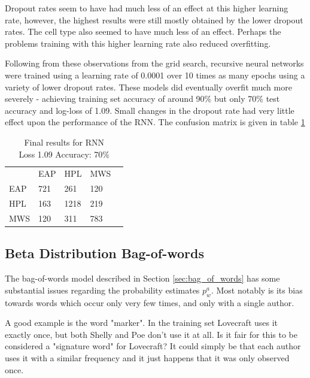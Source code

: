     Dropout rates seem to have had much less of an effect at this higher
    learning rate, however, the highest results were still mostly obtained by
    the lower dropout rates. The cell type also seemed to have much less of an
    effect. Perhaps the problems training with this higher learning rate also
    reduced overfitting.

    Following from these observations from the grid search, recursive neural
    networks were trained using a learning rate of 0.0001 over 10 times as many
    epochs using a variety of lower dropout rates. These models did eventually
    overfit much more severely - achieving training set accuracy of around 90\%
    but only 70\% test accuracy and log-loss of 1.09. Small changes in the
    dropout rate had very little effect upon the performance of the RNN. The
    confusion matrix is given in table \ref{tab:rnn_res}

\begin{table}[h]
\centering
\begin{tabular}{m{1cm}|m{1cm}|m{1cm}|m{1cm}|m{0cm}}
\multicolumn{1}{m{1cm}}{} & \multicolumn{1}{m{1cm}}{EAP} & \multicolumn{1}{m{1cm}}{HPL} & \multicolumn{1}{m{1cm}}{MWS} &\\[5pt]
\cline{2-4}
EAP & 721 & 261 & 120 & \\[5pt]
\cline{2-4}
HPL & 163 & 1218 & 219 & \\[5pt]
\cline{2-4}
MWS & 120 & 311 & 783 & \\[5pt]
\cline{2-4}
\end{tabular}
\caption{Final results for RNN\\Loss 1.09 Accuracy: 70\% }
\label{tab:rnn_res}
\end{table}

\subsection{Beta Distribution Bag-of-words}
\label{sec:bow_beta}
The bag-of-words model described in Section \ref{sec:bag_of_words} has some substantial issues regarding the probability estimates $p_w^a$. Most notably is its bias towards words which occur only very few times, and only with a single author.

A good example is the word "marker". In the training set Lovecraft uses it exactly once, but both Shelly and Poe don't use it at all. Is it fair for this to be considered a "signature word" for Lovecraft? It could simply be that each author uses it with a similar frequency and it just happens that it was only observed once.

